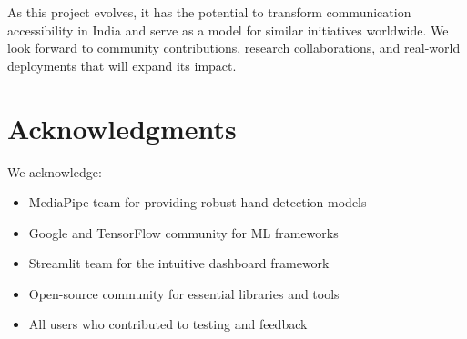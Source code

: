 As this project evolves, it has the potential to transform communication accessibility in India and serve as a model for similar initiatives worldwide. We look forward to community contributions, research collaborations, and real-world deployments that will expand its impact.

\newpage

\section*{Acknowledgments}

We acknowledge:
\begin{itemize}
    \item MediaPipe team for providing robust hand detection models
    \item Google and TensorFlow community for ML frameworks
    \item Streamlit team for the intuitive dashboard framework
    \item Open-source community for essential libraries and tools
    \item All users who contributed to testing and feedback
\end{itemize}


